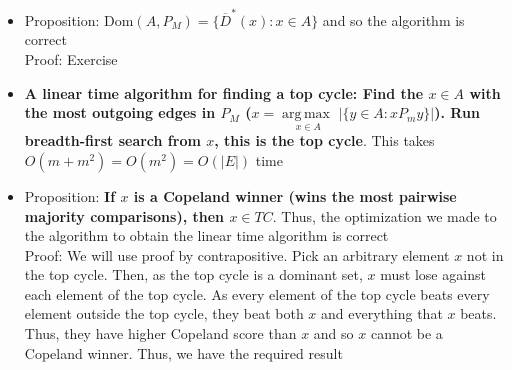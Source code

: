 \documentclass[20pt,a4paper,landscape]{extarticle}
\DeclareMathOperator*{\argmax}{arg\,max\:}
\begin{document}
\begin{flushleft}
\begin{itemize}
\item Proposition: Dom$(A, P_M) = \{\overline{D}^\ast(x): x \in A\}$ and so the algorithm is correct\\
Proof: Exercise
\item \textbf{A linear time algorithm for finding a top cycle: Find the $x \in A$ with the most outgoing edges in $P_M$ ($x = \underset{x \in A}{\argmax}|\{y \in A: xP_my\}|$). Run breadth-first search from $x$, this is the top cycle}. This takes $O(m + m^2) = O(m^2) = O(|E|)$ time
\item Proposition: \textbf{If $x$ is a Copeland winner (wins the most pairwise majority comparisons), then $x \in TC$}. Thus, the optimization we made to the algorithm to obtain the linear time algorithm is correct\\
Proof: We will use proof by contrapositive. Pick an arbitrary element $x$ not in the top cycle. Then, as the top cycle is a dominant set, $x$ must lose against each element of the top cycle. As every element of the top cycle beats every element outside the top cycle, they beat both $x$ and everything that $x$ beats. Thus, they have higher Copeland score than $x$ and so $x$ cannot be a Copeland winner. Thus, we have the required result
\end{itemize}
\clearpage

\end{flushleft}
\end{document}
